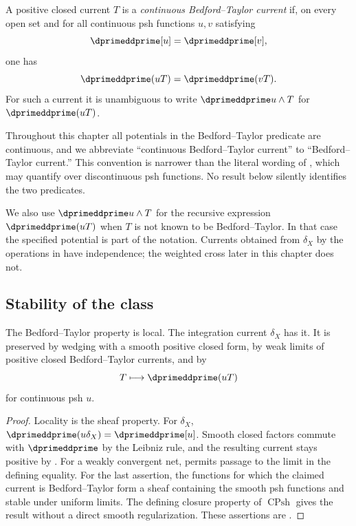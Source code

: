 \begin{definition}
\label{def:ch16-bt-current}
A positive closed current $T$ is a \emph{continuous Bedford--Taylor
current} if, on every open set and for all continuous psh functions $u,v$
satisfying
\[
                     \dprimeddprime[u]=\dprimeddprime[v],
\]
one has
\[
                     \dprimeddprime(uT)=\dprimeddprime(vT).
\]
For such a current it is unambiguous to write
$\dprimeddprime u\wedge T$ for $\dprimeddprime(uT)$.
\end{definition}

Throughout this chapter all potentials in the Bedford--Taylor predicate are
continuous, and we abbreviate ``continuous Bedford--Taylor current'' to
``Bedford--Taylor current.''  This convention is narrower than the literal
wording of \cite[Definition~8.6.2]{CLD25}, which may quantify over
discontinuous psh functions.  No result below silently identifies the two
predicates.

We also use $\dprimeddprime u\wedge T$ for the recursive expression
$\dprimeddprime(uT)$ when $T$ is not known to be Bedford--Taylor.  In that
case the specified potential is part of the notation.  Currents obtained
from $\delta_X$ by the operations in  have
independence; the weighted cross later in this chapter does not.

\subsection{Stability of the class}
\label{sec:ch16-bt-stability}

\begin{proposition}
\label{prop:bt-current-stability}
The Bedford--Taylor property is local.  The integration current $\delta_X$
has it.  It is preserved by wedging with a smooth positive closed form, by
weak limits of positive closed Bedford--Taylor currents, and by
\[
                     T\longmapsto\dprimeddprime(uT)
\]
for continuous psh $u$.
\end{proposition}
\begin{proof}
Locality is the sheaf property.  For $\delta_X$,
$\dprimeddprime(u\delta_X)=\dprimeddprime[u]$.  Smooth closed factors commute
with $\dprimeddprime$ by the Leibniz rule, and the resulting current stays
positive by .  For a weakly convergent net,
 permits passage to the
limit in the defining equality.  For the last assertion, the functions for
which the claimed current is Bedford--Taylor form a sheaf containing the
smooth psh functions and stable under uniform limits.  The defining closure
property of $\operatorname{CPsh}$ gives the result without a direct smooth
regularization.  These assertions are
\cite[Definition~8.6.2 and Propositions~8.6.3, 8.6.5--8.6.8]{CLD25}.
\end{proof}

